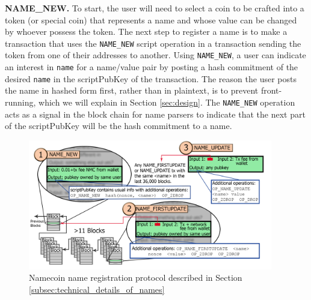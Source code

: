 {\bf NAME\_NEW.}
To start, the user will need to select a coin to be crafted into a token (or special coin) that represents a name and whose value can be changed by whoever possess the token. The next step to register a name is to make a transaction that uses the {\tt NAME\_NEW} script operation in a transaction sending the token from one of their addresses to another. Using {\tt NAME\_NEW}, a user can indicate an interest in {\tt name} for a name/value pair by posting a hash commitment of the desired {\tt name} in the scriptPubKey of the transaction. The reason the user posts the name in hashed form first, rather than in plaintext, is to prevent front-running, which we will explain in Section \ref{sec:design}.
The {\tt NAME\_NEW} operation acts as a signal in the block chain for name parsers to indicate that the next part of the scriptPubKey will be the hash commitment to a name. 

\begin{figure}
  \centering
  \includegraphics[width=0.95\textwidth]{figures/registration.png}
  \caption{Namecoin name registration protocol described in Section \ref{subsec:technical_details_of_names}}
  \label{fig:registration}
\end{figure}

